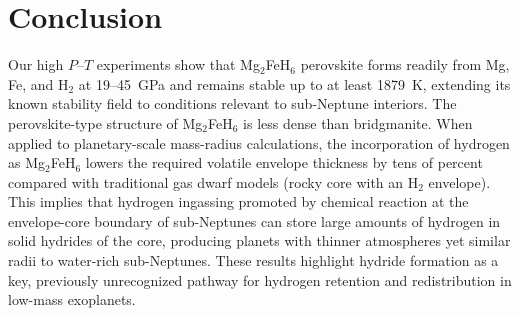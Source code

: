 \documentclass[draft,jgrga,12pt]{agujournal2019}
\begin{document}


\section{Conclusion}


Our high $P$--$T$ experiments show that Mg$_2$FeH$_6$ perovskite forms readily from Mg, Fe, and H$_2$ at 19--45~{GPa} and remains stable up to at least 1879~K, extending its known stability field to conditions relevant to sub-Neptune interiors. 
The perovskite-type structure of Mg$_2$FeH$_6$ is less dense than bridgmanite. 
When applied to planetary-scale mass-radius calculations, the incorporation of hydrogen as Mg$_2$FeH$_6$ lowers the required volatile envelope thickness by tens of percent compared with traditional gas dwarf models (rocky core with an H$_2$ envelope). 
This implies that hydrogen ingassing promoted by chemical reaction at the envelope-core boundary of sub-Neptunes can store large amounts of hydrogen in solid hydrides of the core, producing planets with thinner atmospheres yet similar radii to water-rich sub-Neptunes. 
These results highlight hydride formation as a key, previously unrecognized pathway for hydrogen retention and redistribution in low-mass exoplanets.
\end{document}
